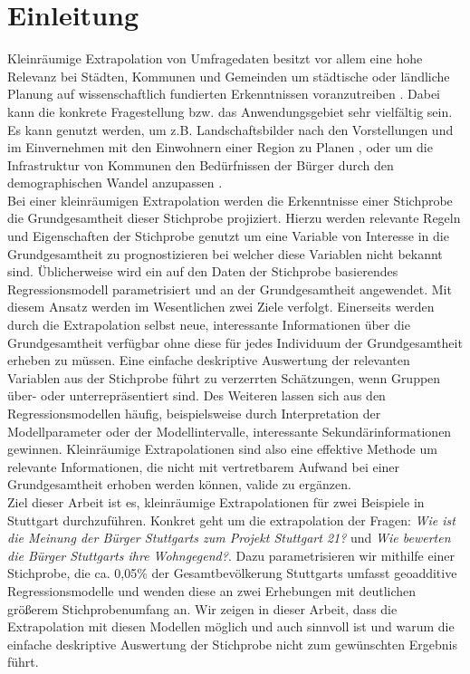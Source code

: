 \documentclass{Vorlage}
\begin{document}
\section{Einleitung}
Kleinräumige Extrapolation von Umfragedaten besitzt vor allem eine hohe Relevanz bei Städten, Kommunen und Gemeinden um städtische oder ländliche Planung auf wissenschaftlich fundierten Erkenntnissen voranzutreiben \cite{Planung}. Dabei kann die konkrete Fragestellung bzw. das Anwendungsgebiet sehr vielfältig sein. Es kann genutzt werden, um z.B. Landschaftsbilder nach den Vorstellungen und im Einvernehmen mit den Einwohnern einer Region zu Planen \cite{Natur}, oder um die Infrastruktur von Kommunen den Bedürfnissen der Bürger durch den demographischen Wandel anzupassen \cite{Lubeck}.\\
Bei einer kleinräumigen Extrapolation werden die Erkenntnisse einer Stichprobe die Grundgesamtheit dieser Stichprobe projiziert. Hierzu werden relevante Regeln und Eigenschaften der Stichprobe genutzt um eine Variable von Interesse in die Grundgesamtheit zu prognostizieren bei welcher diese Variablen nicht bekannt sind. Üblicherweise wird ein auf den Daten der Stichprobe basierendes Regressionsmodell parametrisiert und an der Grundgesamtheit angewendet. Mit diesem Ansatz werden im Wesentlichen zwei Ziele verfolgt. Einerseits werden durch die Extrapolation selbst neue, interessante Informationen über die Grundgesamtheit verfügbar ohne diese für jedes Individuum der Grundgesamtheit erheben zu müssen. Eine einfache deskriptive Auswertung der relevanten Variablen aus der Stichprobe führt zu verzerrten Schätzungen, wenn Gruppen über- oder unterrepräsentiert sind. Des Weiteren lassen sich aus den Regressionsmodellen häufig, beispielsweise durch Interpretation der Modellparameter oder der Modellintervalle, interessante Sekundärinformationen gewinnen. Kleinräumige Extrapolationen sind also eine effektive Methode um relevante Informationen, die nicht mit vertretbarem Aufwand bei einer Grundgesamtheit erhoben werden können, valide zu ergänzen.\\
Ziel dieser Arbeit ist es, kleinräumige Extrapolationen für zwei Beispiele in Stuttgart durchzuführen. Konkret geht um die extrapolation der Fragen: \textit{Wie ist die Meinung der Bürger Stuttgarts zum Projekt Stuttgart 21?} und \textit{Wie bewerten die Bürger Stuttgarts ihre Wohngegend?}. Dazu parametrisieren wir mithilfe einer Stichprobe, die ca. 0,05\% der Gesamtbevölkerung Stuttgarts umfasst geoadditive Regressionsmodelle und wenden diese an zwei Erhebungen mit deutlichen größerem Stichprobenumfang an. Wir zeigen in dieser Arbeit, dass die Extrapolation mit diesen Modellen möglich und auch sinnvoll ist und warum die einfache deskriptive Auswertung der Stichprobe nicht zum gewünschten Ergebnis führt.\\
\end{document}

